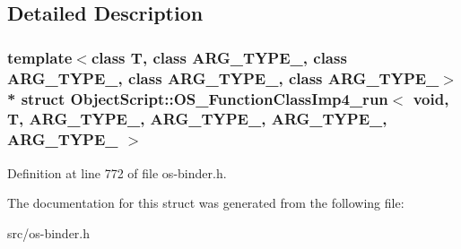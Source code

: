 \subsection{Detailed Description}
\subsubsection*{template$<$class T, class A\+R\+G\+\_\+\+T\+Y\+P\+E\+\_, class A\+R\+G\+\_\+\+T\+Y\+P\+E\+\_, class A\+R\+G\+\_\+\+T\+Y\+P\+E\+\_, class A\+R\+G\+\_\+\+T\+Y\+P\+E\+\_$>$\\*
struct Object\+Script\+::\+O\+S\+\_\+\+Function\+Class\+Imp4\+\_\+run$<$ void, T,   A\+R\+G\+\_\+\+T\+Y\+P\+E\+\_, A\+R\+G\+\_\+\+T\+Y\+P\+E\+\_, A\+R\+G\+\_\+\+T\+Y\+P\+E\+\_, A\+R\+G\+\_\+\+T\+Y\+P\+E\+\_ $>$}



Definition at line 772 of file os-\/binder.\+h.



The documentation for this struct was generated from the following file\+:\begin{DoxyCompactItemize}
\item 
src/os-\/binder.\+h\end{DoxyCompactItemize}
